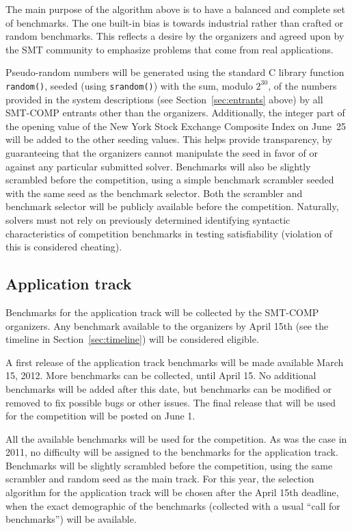 \documentclass[12pt]{article}
\begin{document}
The main purpose of the algorithm above is to have a balanced and complete set
of benchmarks.  The one built-in bias is towards industrial rather than crafted
or random benchmarks.  This reflects a desire by the organizers and agreed upon
by the SMT community to emphasize problems that come from real applications.

Pseudo-random numbers will be generated using the standard C library
function \texttt{random()}, seeded (using \texttt{srandom()}) with the
sum, modulo $2^{30}$, of the numbers provided in the system
descriptions (see Section~\ref{sec:entrants} above) by all SMT-COMP
entrants other than the organizers.  Additionally, the integer part of
the opening value of the New York Stock Exchange Composite Index on
June~25
will be added to the other seeding values.  This helps provide transparency,
by guaranteeing that the organizers cannot manipulate the seed in
favor of or against any particular submitted solver.  Benchmarks will also be slightly
scrambled before the competition, using a simple benchmark scrambler
seeded with the same seed as the benchmark selector.  Both the
scrambler and benchmark selector will be publicly available before the
competition.  Naturally, solvers must not rely on previously
determined identifying syntactic characteristics of competition
benchmarks in testing satisfiability (violation of this is considered
cheating).

\subsection{Application track}

Benchmarks for the application track will be collected by the SMT-COMP organizers.
Any benchmark available to the organizers by April 15th (see the timeline in
Section~\ref{sec:timeline}) will be considered eligible.

A first release of the application track
benchmarks will be made available March 15, 2012.
More benchmarks can be collected, until April 15.
No additional
benchmarks will be added after this date, but benchmarks can be
modified or removed to fix possible bugs or other issues. 
The final release that will be used for the competition will be posted on 
June 1.

All the available benchmarks will be used for the competition. 
As was the case in 2011, no difficulty will be assigned to the benchmarks for the application track.
Benchmarks will be slightly scrambled before the competition, using the same scrambler and 
random seed as the main track. 
For this year, the selection algorithm for the application track will be chosen after the
 April 15th deadline, when the exact demographic of the benchmarks (collected with a usual
``call for benchmarks'') will be available.
\end{document}
